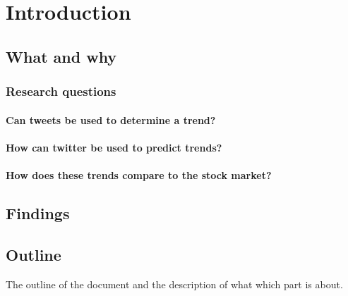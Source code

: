 \section{Introduction}

\subsection{What and why}

\subsubsection{Research questions}
	\paragraph{Can tweets be used to determine a trend?}
	\paragraph{How can twitter be used to predict trends?}
	\paragraph{How does these trends compare to the stock market?}

\subsection{Findings}

\subsection{Outline}
The outline of the document and the description of what which part is about. 


